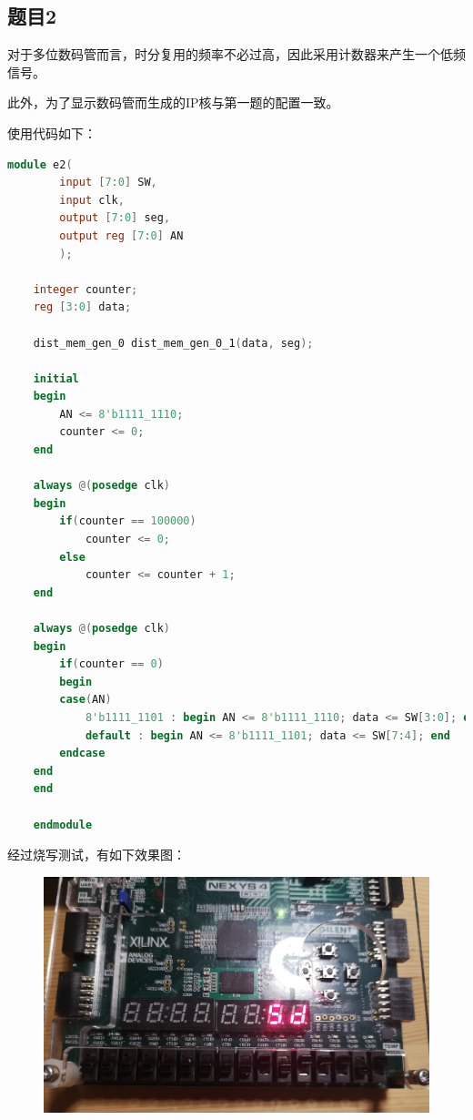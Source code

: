 \documentclass[UTF8]{article}
\begin{document}
	\subsection{题目2}
	对于多位数码管而言，时分复用的频率不必过高，因此采用计数器来产生一个低频信号。\par
	此外，为了显示数码管而生成的IP核与第一题的配置一致。\par
	使用代码如下：
	\begin{lstlisting}[language=Verilog]
	module e2(
		input [7:0] SW,
		input clk,
		output [7:0] seg,
		output reg [7:0] AN
		);
	
	integer counter;
	reg [3:0] data;
	
	dist_mem_gen_0 dist_mem_gen_0_1(data, seg);
	
	initial
	begin
		AN <= 8'b1111_1110;
		counter <= 0;
	end
	
	always @(posedge clk)
	begin
		if(counter == 100000)
			counter <= 0;
		else
			counter <= counter + 1;
	end
		
	always @(posedge clk)
	begin
		if(counter == 0)
		begin
		case(AN)
			8'b1111_1101 : begin AN <= 8'b1111_1110; data <= SW[3:0]; end
			default : begin AN <= 8'b1111_1101; data <= SW[7:4]; end
		endcase
	end
	end
	
	endmodule
	\end{lstlisting}
	经过烧写测试，有如下效果图：\par
	\begin{figure}[H]
		\centering
		\includegraphics[width=1\linewidth]{e2_1.jpg}
		\label{e2_1}
	\end{figure}\par
	
\end{document}
